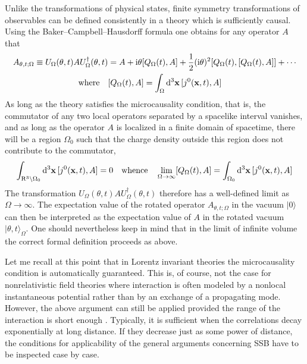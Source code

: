 \documentclass[final,3p,times,12pt,a4paper,sort&compress]{elsarticle}
\newcommand\gr[1]{\mathrm{#1}}              %
\newcommand\R{\gr{R}}
\newcommand\vek[1]{{\boldsymbol{\bf #1}}}   %
\newcommand\ket[1]{\vert#1\rangle}          %
\newcommand\he[1]{#1^{\dagger}}             %
\newcommand\imag{\mathrm i}                 %
\newcommand\vt{\theta}
\newcommand\dthree{\mathop{{\rm d}^3\!}\nolimits} %
\begin{document}
Unlike the transformations of physical states, finite symmetry transformations
of observables can be defined consistently in a theory which is sufficiently
causal. Using the Baker--Campbell--Hausdorff formula one obtains for any
operator $A$ that
\begin{equation}
\begin{split}
A_{\vt,t;\Omega}\equiv U_\Omega(\vt,t)A\he U_\Omega(\vt,t)&=
A+\imag\vt[Q_\Omega(t),A]+\frac12(\imag\vt)^2[Q_\Omega(t),[Q_\Omega(t),A]]
+\dotsb\\
\text{where}\quad
&[Q_\Omega(t),A]=\int_\Omega\dthree\vek x\,[j^0(\vek x,t),A]
\end{split}
\label{intcharge}
\end{equation}
As long as the theory satisfies the microcausality condition, that is, the
commutator of any two local operators separated by a spacelike interval
vanishes, and as long as the operator $A$ is localized in a finite domain of
spacetime, there will be a region $\Omega_0$ such that the charge density
outside this region does not contribute to the commutator,
\begin{equation}
\int_{\R^3\backslash\Omega_0}\dthree\vek x\,[j^0(\vek x,t),A]=0
\quad\text{whence}\quad
\lim_{\Omega\to\infty}[Q_\Omega(t),A]=\int_{\Omega_0}\dthree\vek x\,
[j^0(\vek x,t),A]
\end{equation}
The transformation $U_\Omega(\vt,t)A\he U_\Omega(\vt,t)$ therefore has a
well-defined limit as $\Omega\to\infty$. The expectation value of the rotated
operator $A_{\vt,t;\Omega}$ in the vacuum $\ket0$ can then be interpreted as the
expectation value of $A$ in the rotated vacuum $\ket{\vt,t}_\Omega$. One should
nevertheless keep in mind that in the limit of infinite volume the correct
formal definition proceeds as above.

Let me recall at this point that in Lorentz invariant theories the
microcausality condition is automatically guaranteed. This is, of course, not
the case for nonrelativistic field theories where interaction is often modeled
by a nonlocal instantaneous potential rather than by an exchange of a
propagating mode. However, the above argument can still be applied provided the
range of the interaction is short enough \cite{Lange:1966zz}. Typically, it is
sufficient when the correlations decay exponentially at long distance. If they
decrease just as some power of distance, the conditions for applicability of the
general arguments concerning SSB have to be inspected case by case.
\end{document}
